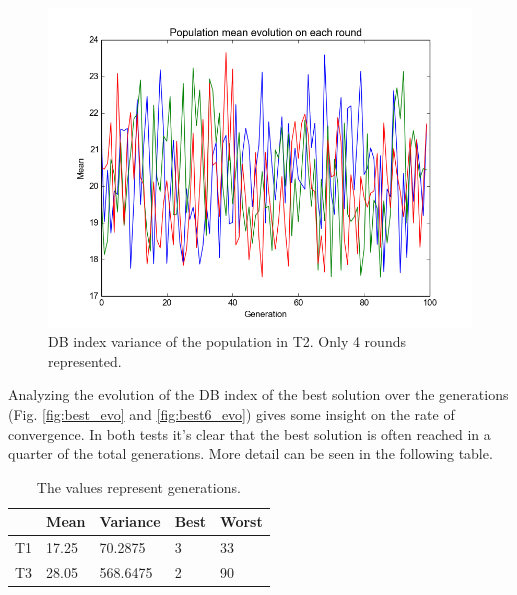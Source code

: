 \documentclass[12pt,a4paper,final]{article}
\begin{document}
\begin{figure}[hbtp]
\centering
\includegraphics[scale=0.6]{bi_nofactor_mean.png}
\caption{DB index variance of the population in T2. Only 4 rounds represented.}
\label{fig:var_evo}
\end{figure}

Analyzing the evolution of the DB index of the best solution over the generations (Fig. \ref{fig:best_evo} and \ref{fig:best6_evo}) gives some insight on the rate of convergence. In both tests it's clear that the best solution is often reached in a quarter of the total generations. More detail can be seen in the following table.

\begin{table}[h]
\caption{The values represent generations.}
\label{my-label}
\begin{tabular}{|l|l|l|l|l|}
\hline
	 & Mean & Variance & Best     & Worst     \\ \hline
T1   & 17.25    & 70.2875  & 3     & 33 \\ \hline
T3   & 28.05    & 568.6475 & 2     & 90 \\ \hline
\end{tabular}
\end{table}
\end{document}
